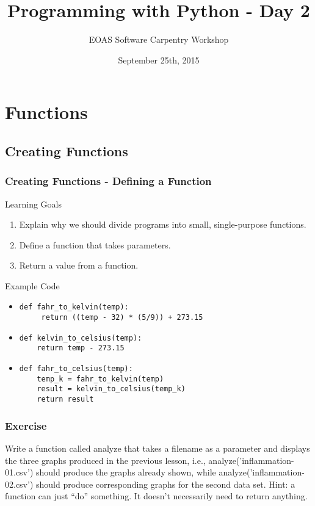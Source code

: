 \documentclass{beamer}
\title[Python]{Programming with Python - Day 2}
\subtitle[]{EOAS Software Carpentry Workshop }
\date[Sep 2015]{September 25th, 2015}
\begin{document}
\section*{Functions}

\begin{frame}[plain] 
\titlepage
\end{frame}


\subsection*{Creating Functions}

\begin{frame}[fragile]
\frametitle{Creating Functions - Defining a Function}
\begin{block}{Learning Goals}
\begin{enumerate}
\item Explain why we should divide programs into small, single-purpose functions.
\item Define a function that takes parameters.
\item Return a value from a function.
\end{enumerate}
\end{block}

\begin{block}{Example Code}
\begin{itemize}
\item
\begin{verbatim}
def fahr_to_kelvin(temp):
     return ((temp - 32) * (5/9)) + 273.15
\end{verbatim}
\item
\begin{verbatim}
def kelvin_to_celsius(temp):
    return temp - 273.15
\end{verbatim}

\item
\begin{verbatim}
def fahr_to_celsius(temp):
    temp_k = fahr_to_kelvin(temp)
    result = kelvin_to_celsius(temp_k)
    return result
\end{verbatim}
\end{itemize}
\end{block}
\end{frame}


\begin{frame}
\frametitle{Exercise}
Write a function called analyze that takes a filename as a parameter and displays the three graphs produced in the previous lesson, i.e., analyze('inflammation-01.csv') should produce the graphs already shown, while analyze('inflammation-02.csv') should produce corresponding graphs for the second data set. Hint: a function can just ``do'' something.  It doesn't necessarily need to return anything.
\end{frame}
\end{document}
